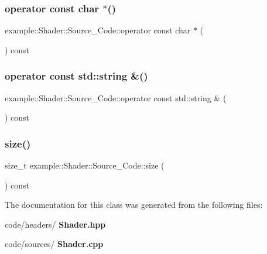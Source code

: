 \mbox{\label{classexample_1_1_shader_1_1_source___code_ae9f1b732bad5360c81abdf0912cb0f9e}} 
\subsubsection{operator const char $\ast$()}
{\footnotesize\ttfamily example\+::\+Shader\+::\+Source\+\_\+\+Code\+::operator const char $\ast$ (\begin{DoxyParamCaption}{ }\end{DoxyParamCaption}) const\hspace{0.3cm}{\ttfamily [inline]}}

\mbox{\label{classexample_1_1_shader_1_1_source___code_a61fcc5c271673f67740263735e40759d}} 
\subsubsection{operator const std::string \&()}
{\footnotesize\ttfamily example\+::\+Shader\+::\+Source\+\_\+\+Code\+::operator const std\+::string \& (\begin{DoxyParamCaption}{ }\end{DoxyParamCaption}) const\hspace{0.3cm}{\ttfamily [inline]}}

\mbox{\label{classexample_1_1_shader_1_1_source___code_a292ec182f1e3e7440bbda037c25df24c}} 
\subsubsection{size()}
{\footnotesize\ttfamily size\+\_\+t example\+::\+Shader\+::\+Source\+\_\+\+Code\+::size (\begin{DoxyParamCaption}{ }\end{DoxyParamCaption}) const\hspace{0.3cm}{\ttfamily [inline]}}



The documentation for this class was generated from the following files\+:\begin{DoxyCompactItemize}
\item 
code/headers/\textbf{ Shader.\+hpp}\item 
code/sources/\textbf{ Shader.\+cpp}\end{DoxyCompactItemize}
